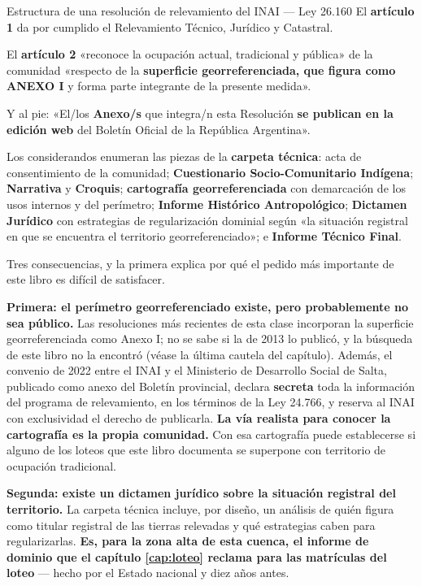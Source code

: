 \begin{ficha}{Estructura de una resolución de relevamiento del INAI --- Ley 26.160}
El \textbf{artículo 1} da por cumplido el Relevamiento Técnico, Jurídico y Catastral.

El \textbf{artículo 2} «reconoce la ocupación actual, tradicional y pública» de la comunidad
«respecto de la \textbf{superficie georreferenciada, que figura como ANEXO I} y forma parte
integrante de la presente medida».

Y al pie: «El/los \textbf{Anexo/s} que integra/n esta Resolución \textbf{se publican en la
edición web} del Boletín Oficial de la República Argentina».

Los considerandos enumeran las piezas de la \textbf{carpeta técnica}: acta de consentimiento
de la comunidad; \textbf{Cuestionario Socio-Comunitario Indígena}; \textbf{Narrativa} y
\textbf{Croquis}; \textbf{cartografía georreferenciada} con demarcación de los usos internos y
del perímetro; \textbf{Informe Histórico Antropológico}; \textbf{Dictamen Jurídico} con
estrategias de regularización dominial según «la situación registral en que se encuentra el
territorio georreferenciado»; e \textbf{Informe Técnico Final}.
\end{ficha}

Tres consecuencias, y la primera explica por qué el pedido más importante de este libro es difícil de satisfacer.

\textbf{Primera: el perímetro georreferenciado existe, pero probablemente no sea público.} Las resoluciones más recientes de esta clase incorporan la superficie georreferenciada como Anexo I; no se sabe si la de 2013 lo publicó, y la búsqueda de este libro no la encontró (véase la última cautela del capítulo). Además, el convenio de 2022 entre el INAI y el Ministerio de Desarrollo Social de Salta, publicado como anexo del Boletín provincial, declara \textbf{secreta} toda la información del programa de relevamiento, en los términos de la Ley 24.766, y reserva al INAI con exclusividad el derecho de publicarla. \textbf{La vía realista para conocer la cartografía es la propia comunidad.} Con esa cartografía puede establecerse si alguno de los loteos que este
libro documenta se superpone con territorio de ocupación tradicional.

\textbf{Segunda: existe un dictamen jurídico sobre la situación registral del territorio.} La
carpeta técnica incluye, por diseño, un análisis de quién figura como titular registral de
las tierras relevadas y qué estrategias caben para regularizarlas. \textbf{Es, para la zona
alta de esta cuenca, el informe de dominio que el capítulo \ref{cap:loteo} reclama para las matrículas del
loteo} --- hecho por el Estado nacional y diez años antes.

